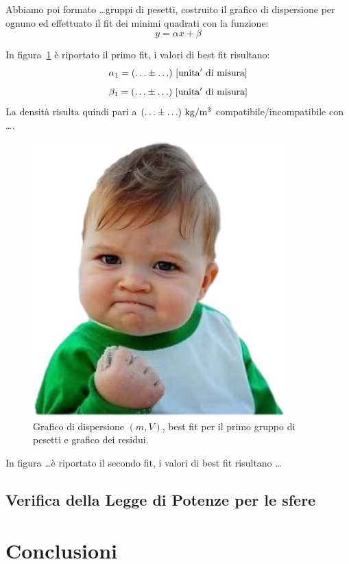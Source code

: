 \documentclass{article}
\begin{document}
Abbiamo poi formato \ldots gruppi di pesetti, costruito il grafico di dispersione per ognuno ed effettuato il fit dei minimi quadrati con la funzione:
\begin{equation}
    y = \alpha x + \beta
\end{equation}

In figura~\ref{fig:density1} \`e riportato il primo fit, i valori di best fit risultano:
\begin{equation}
    \alpha_1 = (\ldots \pm \ldots)\ \rm [unita'\ di\ misura]
    \end{equation}
    \begin{equation}
        \beta_1 = (\ldots \pm \ldots)\ \rm [unita'\ di\ misura]
\end{equation}
La densit\`a risulta quindi pari a $(\ldots\pm\ldots)\ \rm kg/m^3$ compatibile/incompatibile con \ldots.

\begin{figure}
    \centering
     \includegraphics[width=0.5\linewidth]{stupid.png}
    \caption{Grafico di dispersione $(m,V)$, best fit per il primo gruppo di pesetti e grafico dei residui.}
    \label{fig:density1}
\end{figure}

In figura \ldots  \`e riportato il secondo fit, i valori di best fit risultano \ldots

\subsection{Verifica della Legge di Potenze per le sfere}


\section{Conclusioni}
\end{document}
